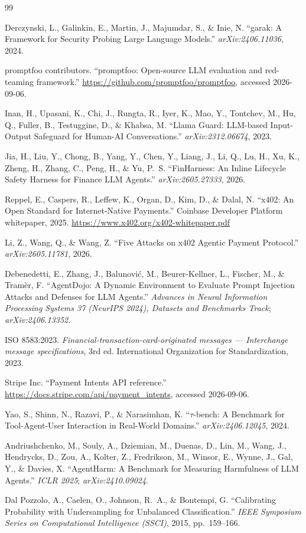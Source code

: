 \documentclass{article}
\begin{document}
\begin{thebibliography}{99}
\small

 Derczynski, L., Galinkin, E., Martin, J., Majumdar, S., \& Inie, N.
``garak: A Framework for Security Probing Large Language Models.'' \emph{arXiv:2406.11036}, 2024.

 promptfoo contributors. ``promptfoo: Open-source LLM evaluation and
red-teaming framework.'' \url{https://github.com/promptfoo/promptfoo}, accessed 2026-09-06.

 Inan, H., Upasani, K., Chi, J., Rungta, R., Iyer, K., Mao, Y.,
Tontchev, M., Hu, Q., Fuller, B., Testuggine, D., \& Khabsa, M. ``Llama Guard: LLM-based
Input-Output Safeguard for Human-AI Conversations.'' \emph{arXiv:2312.06674}, 2023.

 Jia, H., Liu, Y., Chong, B., Yang, Y., Chen, Y., Liang, J., Li, Q.,
Lu, H., Xu, K., Zheng, H., Zhang, C., Peng, H., \& Yu, P.\ S. ``FinHarness: An Inline
Lifecycle Safety Harness for Finance LLM Agents.'' \emph{arXiv:2605.27333}, 2026.

 Reppel, E., Caspers, R., Leffew, K., Organ, D., Kim, D., \& Dalal, N.
``x402: An Open Standard for Internet-Native Payments.'' Coinbase Developer Platform
whitepaper, 2025. \url{https://www.x402.org/x402-whitepaper.pdf}

 Li, Z., Wang, Q., \& Wang, Z. ``Five Attacks on x402 Agentic Payment
Protocol.'' \emph{arXiv:2605.11781}, 2026.

 Debenedetti, E., Zhang, J., Balunovi\'{c}, M., Beurer-Kellner, L.,
Fischer, M., \& Tram\`{e}r, F. ``AgentDojo: A Dynamic Environment to Evaluate Prompt
Injection Attacks and Defenses for LLM Agents.'' \emph{Advances in Neural Information
Processing Systems 37 (NeurIPS 2024), Datasets and Benchmarks Track}; \emph{arXiv:2406.13352}.

 ISO 8583:2023. \emph{Financial-transaction-card-originated messages ---
Interchange message specifications}, 3rd ed. International Organization for Standardization, 2023.

 Stripe Inc. ``Payment Intents API reference.''
\url{https://docs.stripe.com/api/payment_intents}, accessed 2026-09-06.

 Yao, S., Shinn, N., Razavi, P., \& Narasimhan, K. ``$\tau$-bench: A
Benchmark for Tool-Agent-User Interaction in Real-World Domains.'' \emph{arXiv:2406.12045}, 2024.

 Andriushchenko, M., Souly, A., Dziemian, M., Duenas, D., Lin, M.,
Wang, J., Hendrycks, D., Zou, A., Kolter, Z., Fredrikson, M., Winsor, E., Wynne, J.,
Gal, Y., \& Davies, X. ``AgentHarm: A Benchmark for Measuring Harmfulness of LLM Agents.''
\emph{ICLR 2025}; \emph{arXiv:2410.09024}.

 Dal Pozzolo, A., Caelen, O., Johnson, R.\ A., \& Bontempi, G.
``Calibrating Probability with Undersampling for Unbalanced Classification.''
\emph{IEEE Symposium Series on Computational Intelligence (SSCI)}, 2015, pp.~159--166.

\end{thebibliography}
\end{document}

